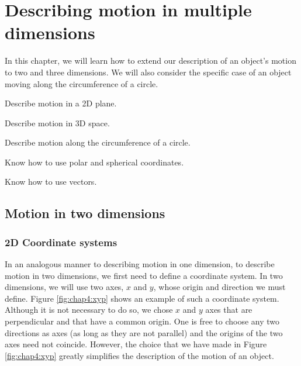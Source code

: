 %
\chapter{Describing motion in multiple dimensions}
\label{chap:4_KinematicsND}
In this chapter, we will learn how to extend our description of an object's motion to two and three dimensions. We will also consider the specific case of an  object moving along the circumference of a circle. 

\vspace{1cm}
\begin{learningObjectives}
\item Describe motion in a 2D plane.
\item Describe motion in 3D space.
\item Describe motion along the circumference of a circle.
\item Know how to use polar and spherical coordinates.
\item Know how to use vectors.
\end{learningObjectives}

\section{Motion in two dimensions}
\subsection{2D Coordinate systems}
In an analogous manner to describing motion in one dimension, to describe motion in two dimensions, we first need to define a coordinate system. In two dimensions, we will use two axes, $x$ and $y$, whose origin and direction we must define. Figure \ref{fig:chap4:xyp} shows an example of such a coordinate system. Although it is not necessary to do so, we chose $x$ and $y$ axes that are perpendicular and that have a common origin. One is free to choose any two directions as axes (as long as they are not parallel) and the origins of the two axes need not coincide. However, the choice that we have made in Figure \ref{fig:chap4:xyp} greatly simplifies the description of the motion of an object.

